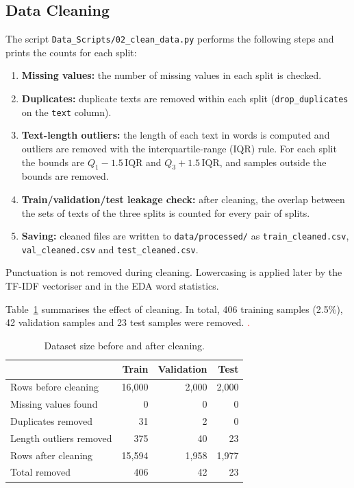 \documentclass[12pt]{article}
\begin{document}
\subsection{Data Cleaning}
The script \texttt{Data\_Scripts/02\_clean\_data.py} performs the following steps and prints the counts for each split:
\begin{enumerate}
  \item \textbf{Missing values:} the number of missing values in each split is checked.
  \item \textbf{Duplicates:} duplicate texts are removed within each split (\texttt{drop\_duplicates} on the \texttt{text} column).
  \item \textbf{Text-length outliers:} the length of each text in words is computed and outliers are removed with the interquartile-range (IQR) rule. For each split the bounds are $Q_1 - 1.5\,\mathrm{IQR}$ and $Q_3 + 1.5\,\mathrm{IQR}$, and samples outside the bounds are removed.
  \item \textbf{Train/validation/test leakage check:} after cleaning, the overlap between the sets of texts of the three splits is counted for every pair of splits.
  \item \textbf{Saving:} cleaned files are written to \texttt{data/processed/} as \texttt{train\_cleaned.csv}, \texttt{val\_cleaned.csv} and \texttt{test\_cleaned.csv}.
\end{enumerate}
Punctuation is not removed during cleaning. Lowercasing is applied later by the TF-IDF vectoriser and in the EDA word statistics.

Table~\ref{tab:cleaning} summarises the effect of cleaning. In total, 406 training samples (2.5\%), 42 validation samples and 23 test samples were removed. \textcolor{red}.

\begin{table}[H]
\centering
\caption{Dataset size before and after cleaning.}
\label{tab:cleaning}
\begin{tabular}{lrrr}
\toprule
 & Train & Validation & Test \\
\midrule
Rows before cleaning & 16{,}000 & 2{,}000 & 2{,}000 \\
Missing values found & 0 & 0 & 0 \\
Duplicates removed & 31 & 2 & 0 \\
Length outliers removed & 375 & 40 & 23 \\
\midrule
Rows after cleaning & 15{,}594 & 1{,}958 & 1{,}977 \\
Total removed & 406 & 42 & 23 \\
\bottomrule
\end{tabular}
\end{table}
\end{document}
